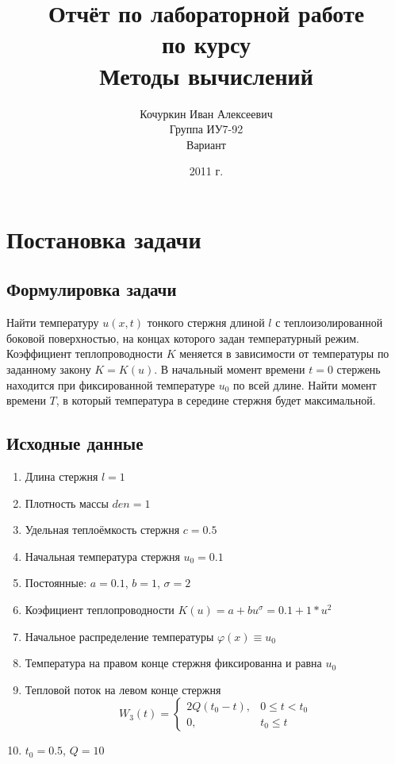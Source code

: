 \documentclass[titlepage,12pt]{article}
\author{Кочуркин Иван Алексеевич\\ Группа ИУ7-92 \\ Вариант \textnumero 11}
\title{Отчёт по лабораторной работе \textnumero 1 \\по курсу\\ Методы вычислений}
\date{2011 г.}
\begin{document}
\maketitle

\section{Постановка задачи}
\subsection{Формулировка задачи}

Найти температуру $u(x,t)$ тонкого стержня длиной $l$ с теплоизолированной боковой поверхностью, на концах которого задан температурный режим. Коэффициент теплопроводности $K$ меняется в зависимости от температуры по заданному закону \( K=K(u) \). В начальный момент времени \( t=0 \) стержень находится при фиксированной температуре $u_0$ по всей длине. Найти момент времени $T$, в который температура в середине стержня будет максимальной.

\subsection{Исходные данные}
\begin{enumerate}
	\item{Длина стержня \(l = 1\)}
	\item{Плотность массы \(den = 1\)}
	\item{Удельная теплоёмкость стержня \(c = 0.5\)}
	\item{Начальная температура стержня \(u_0 = 0.1\)}
	\item{Постоянные: \(a = 0.1\), \(b = 1\), \(\sigma = 2\)}
	\item{Коэфициент теплопроводности \(K(u) = a + bu^\sigma = 0.1 + 1*u^{2}\)}
	\item{Начальное распределение температуры \(\varphi (x) \equiv u_0\)}
	
	\item{Температура на правом конце стержня фиксированна и равна \(u_0\)}
	
		\item{Тепловой поток на левом конце стержня}
	\begin{equation}
	W_3(t) = \begin{cases}
							2Q (t_0-t), &\text{$0 \leqslant t < t_0$}\\ 
							0, &\text{$t_0 \leqslant t$}
				 			\end{cases}
	\end{equation}
	
	\item{\(t_0 = 0.5\), \(Q = 10\)}
\end{enumerate}
\end{document}
